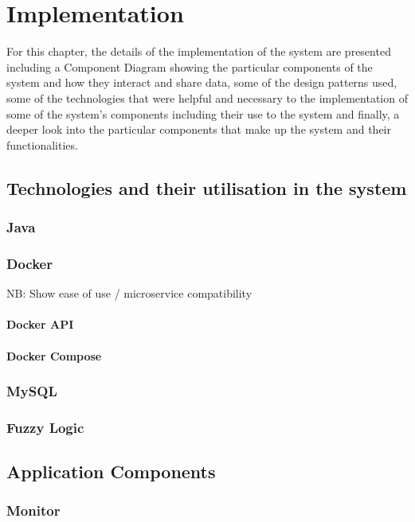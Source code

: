 \chapter{Implementation}\label{ch:conclusions}
For this chapter, the details of the implementation of the system are presented including a Component Diagram showing the particular components of the system and how they interact and share data, some of the design patterns used, some of the technologies that were helpful and necessary to the implementation of some of the system's components including their use to the system and finally, a deeper look into the particular components that make up the system and their functionalities.


\section{Technologies and their utilisation in the system}
\subsection{Java}
\subsection{Docker}
NB: Show ease of use / microservice compatibility
\subsubsection{Docker API}
\subsubsection{Docker Compose}

\subsection{MySQL}
\subsection{Fuzzy Logic}

\section{Application Components}
\cite{iglesia2015mape}

\subsection{Monitor}
